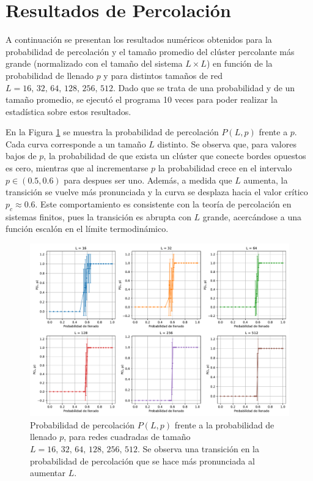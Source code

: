 \documentclass{article}
\begin{document}
\section{Resultados de Percolación}

A continuación se presentan los resultados numéricos obtenidos para la probabilidad de percolación y el tamaño promedio del clúster percolante más grande (normalizado con el tamaño del sistema \( L \times L \)) en función de la probabilidad de llenado \(p\) y para distintos tamaños de red \(L = 16,\,32,\,64,\,128,\,256,\,512\). Dado que se trata de una probabilidad y de un tamaño promedio, se ejecutó el programa 10 veces para poder realizar la estadística sobre estos resultados.

En la Figura \ref{fig:perc_prob} se muestra la probabilidad de percolación \(P(L,p)\) frente a \(p\). Cada curva corresponde a un tamaño \(L\) distinto. Se observa que, para valores bajos de \(p\), la probabilidad de que exista un clúster que conecte bordes opuestos es cero, mientras que al incrementarse \(p\) la probabilidad crece en el intervalo \(p\in(0.5, 0.6)\) para despues ser uno. Además, a medida que \(L\) aumenta, la transición se vuelve más pronunciada y la curva se desplaza hacia el valor crítico \(p_c \approx 0.6\). Este comportamiento es consistente con la teoría de percolación en sistemas finitos, pues la transición es abrupta con \(L\) grande, acercándose a una función escalón en el límite termodinámico.

\begin{figure}[h]
    \centering
    \includegraphics[width=1.0\textwidth]{figures/Perc_prob.pdf}
    \caption{Probabilidad de percolación \(P(L,p)\) frente a la probabilidad de llenado \(p\), para redes cuadradas de tamaño \(L = 16,\,32,\,64,\,128,\,256,\,512\). Se observa una transición en la probabilidad de percolación que se hace más pronunciada al aumentar \(L\).}
    \label{fig:perc_prob}
\end{figure}
\end{document}
